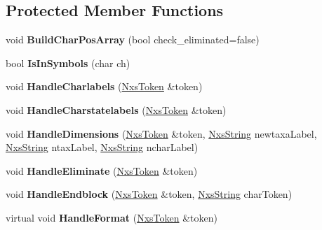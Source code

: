 \subsection*{Protected Member Functions}
\begin{DoxyCompactItemize}
\item 
\hypertarget{classNxsCharactersBlock_ac4e2040633ec934055c68229b7030129}{
void {\bfseries BuildCharPosArray} (bool check\_\-eliminated=false)}
\label{classNxsCharactersBlock_ac4e2040633ec934055c68229b7030129}

\item 
\hypertarget{classNxsCharactersBlock_adda12e700129a5adbcb62d04dfb5aea4}{
bool {\bfseries IsInSymbols} (char ch)}
\label{classNxsCharactersBlock_adda12e700129a5adbcb62d04dfb5aea4}

\item 
\hypertarget{classNxsCharactersBlock_a687f6d028e959d04e8662251b1946514}{
void {\bfseries HandleCharlabels} (\hyperlink{classNxsToken}{NxsToken} \&token)}
\label{classNxsCharactersBlock_a687f6d028e959d04e8662251b1946514}

\item 
\hypertarget{classNxsCharactersBlock_a28830ac9b39ade49fefafb2e7ba33a16}{
void {\bfseries HandleCharstatelabels} (\hyperlink{classNxsToken}{NxsToken} \&token)}
\label{classNxsCharactersBlock_a28830ac9b39ade49fefafb2e7ba33a16}

\item 
\hypertarget{classNxsCharactersBlock_a2403d3b7e8c91566a2bb39dc7807e33e}{
void {\bfseries HandleDimensions} (\hyperlink{classNxsToken}{NxsToken} \&token, \hyperlink{classNxsString}{NxsString} newtaxaLabel, \hyperlink{classNxsString}{NxsString} ntaxLabel, \hyperlink{classNxsString}{NxsString} ncharLabel)}
\label{classNxsCharactersBlock_a2403d3b7e8c91566a2bb39dc7807e33e}

\item 
\hypertarget{classNxsCharactersBlock_a051b9cfd99599fd8894c067274952d30}{
void {\bfseries HandleEliminate} (\hyperlink{classNxsToken}{NxsToken} \&token)}
\label{classNxsCharactersBlock_a051b9cfd99599fd8894c067274952d30}

\item 
\hypertarget{classNxsCharactersBlock_a635fe7add4fee21d8d40a3f50ab1d740}{
void {\bfseries HandleEndblock} (\hyperlink{classNxsToken}{NxsToken} \&token, \hyperlink{classNxsString}{NxsString} charToken)}
\label{classNxsCharactersBlock_a635fe7add4fee21d8d40a3f50ab1d740}

\item 
\hypertarget{classNxsCharactersBlock_a8fc039e274e43180293b6f0741f5486f}{
virtual void {\bfseries HandleFormat} (\hyperlink{classNxsToken}{NxsToken} \&token)}
\label{classNxsCharactersBlock_a8fc039e274e43180293b6f0741f5486f}


\end{DoxyCompactItemize}
